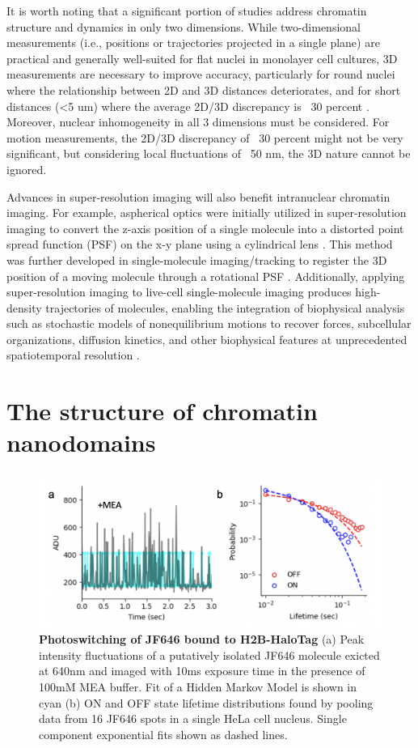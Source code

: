 It is worth noting that a significant portion of studies address chromatin structure and dynamics in only two dimensions. While two-dimensional measurements (i.e., positions or trajectories projected in a single plane) are practical and generally well-suited for flat nuclei in monolayer cell cultures, 3D measurements are necessary to improve accuracy, particularly for round nuclei where the relationship between 2D and 3D distances deteriorates, and for short distances (<5 um) where the average 2D/3D discrepancy is ~30 percent \parencite{Finn2017}. Moreover, nuclear inhomogeneity in all 3 dimensions must be considered. For motion measurements, the 2D/3D discrepancy of ~30 percent might not be very significant, but considering local fluctuations of ~50 nm, the 3D nature cannot be ignored.

Advances in super-resolution imaging will also benefit intranuclear chromatin imaging. For example, aspherical optics were initially utilized in super-resolution imaging to convert the z-axis position of a single molecule into a distorted point spread function (PSF) on the x-y plane using a cylindrical lens \parencite{Huang2008}. This method was further developed in single-molecule imaging/tracking to register the 3D position of a moving molecule through a rotational PSF \parencite{Greengard2006,Pavani2009,Badieirostami2010,Thompson2010}. Additionally, applying super-resolution imaging to live-cell single-molecule imaging produces high-density trajectories of molecules, enabling the integration of biophysical analysis such as stochastic models of nonequilibrium motions to recover forces, subcellular organizations, diffusion kinetics, and other biophysical features at unprecedented spatiotemporal resolution \parencite{Hoze2012,Holcman2015,Hoze2015}.


\section{The structure of chromatin nanodomains}

\begin{figure}[t]
\centering
\includegraphics[width=13cm]{media/Lifetime.png}
\caption{\textbf{Photoswitching of JF646 bound to H2B-HaloTag} (a) Peak intensity fluctuations of a putatively isolated JF646 molecule exicted at 640nm and imaged with 10ms exposure time in the presence of 100mM MEA buffer. Fit of a Hidden Markov Model is shown in cyan (b) ON and OFF state lifetime distributions found by pooling data from 16 JF646 spots in a single HeLa cell nucleus. Single component exponential fits shown as dashed lines.}
\label{fig:fig16}
\end{figure}


